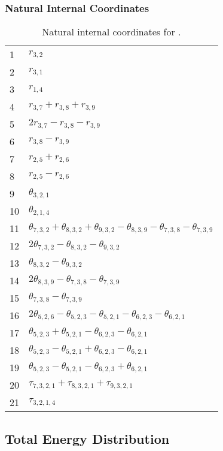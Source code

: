 \documentclass[10pt,oneside]{article}
\begin{document}
\begin{table}[h!]
\subsubsection*{Natural Internal Coordinates}
\centering
\caption{Natural internal coordinates for .}
\small
\begin{tabular}{ll}
\toprule
  1   & $r_{3,2}$ \\
  2   & $r_{3,1}$ \\
  3   & $r_{1,4}$ \\
  4   & $r_{3,7} + r_{3,8} + r_{3,9}$ \\
  5   & $2r_{3,7} - r_{3,8} - r_{3,9}$ \\
  6   & $r_{3,8} - r_{3,9}$ \\
  7   & $r_{2,5} + r_{2,6}$ \\
  8   & $r_{2,5} - r_{2,6}$ \\
  9   & $\theta_{3,2,1}$ \\
  10  & $\theta_{2,1,4}$ \\
  11  & $\theta_{7,3,2} + \theta_{8,3,2} + \theta_{9,3,2} - \theta_{8,3,9} - \theta_{7,3,8} - \theta_{7,3,9}$ \\
  12  & $2\theta_{7,3,2} - \theta_{8,3,2} - \theta_{9,3,2}$ \\
  13  & $\theta_{8,3,2} - \theta_{9,3,2}$ \\
  14  & $2\theta_{8,3,9} - \theta_{7,3,8} - \theta_{7,3,9}$ \\
  15  & $\theta_{7,3,8} - \theta_{7,3,9}$ \\
  16  & $2\theta_{5,2,6} - \theta_{5,2,3} - \theta_{5,2,1} - \theta_{6,2,3} - \theta_{6,2,1}$ \\
  17  & $\theta_{5,2,3} + \theta_{5,2,1} - \theta_{6,2,3} - \theta_{6,2,1}$ \\
  18  & $\theta_{5,2,3} - \theta_{5,2,1} + \theta_{6,2,3} - \theta_{6,2,1}$ \\
  19  & $\theta_{5,2,3} - \theta_{5,2,1} - \theta_{6,2,3} + \theta_{6,2,1}$ \\
  20  & $\tau_{7,3,2,1} + \tau_{8,3,2,1} + \tau_{9,3,2,1}$ \\
  21  & $\tau_{3,2,1,4}$ \\
\bottomrule
\end{tabular}
\end{table}

\begin{table}
\subsection*{Total Energy Distribution}
\centering\end{table}
\end{document}
